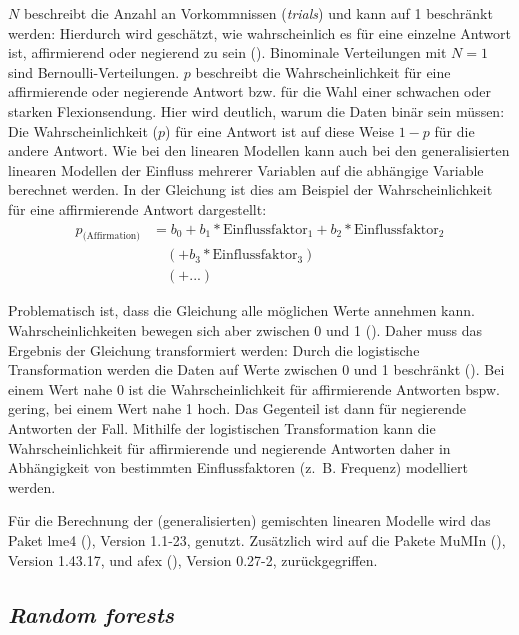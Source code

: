 $N$ beschreibt die Anzahl an Vorkommnissen (\textit{trials}) und kann auf 1 beschränkt werden: Hierdurch wird geschätzt, wie wahrscheinlich es für eine einzelne Antwort ist, affirmierend oder negierend zu sein (\cite[200]{Winter.2020}). Binominale Verteilungen mit $N=1$ sind Bernoulli-Verteilungen. $p$ beschreibt die Wahrscheinlichkeit für eine affirmierende oder negierende Antwort bzw. für die Wahl einer schwachen oder starken Flexionsendung. Hier wird deutlich, warum die Daten binär sein müssen: Die Wahrscheinlichkeit ($p$) für eine Antwort ist auf diese Weise $1-p$ für die andere Antwort. Wie bei den linearen Modellen kann auch bei den generalisierten linearen Modellen der Einfluss mehrerer Variablen auf die abhängige Variable berechnet werden. In der Gleichung ist dies am Beispiel der Wahrscheinlichkeit für eine affirmierende Antwort dargestellt: 
\[
\begin{split}
p_{\text{(Affirmation)}} & =  b{_0} + b{_1} * \text{Einflussfaktor}{_1} + b{_2} * \text{Einflussfaktor}{_2} \\
                         & \quad (+ b{_3}* \text{Einflussfaktor}{_3})\\
                         & \quad (+ ...)
\end{split}
\]

Problematisch ist, dass die Gleichung alle möglichen Werte annehmen kann. Wahrscheinlichkeiten bewegen sich aber zwischen 0 und 1 (\cite[201]{Winter.2020}). Daher muss das Ergebnis der Gleichung transformiert werden: Durch die logistische Transformation werden die Daten auf Werte zwischen 0 und 1 beschränkt (\cite[201--202]{Winter.2020}). Bei einem Wert nahe 0 ist die Wahrscheinlichkeit für affirmierende Antworten bspw. gering, bei einem Wert nahe 1 hoch. Das Gegenteil ist dann für negierende Antworten der Fall.  Mithilfe der logistischen Transformation kann die Wahrscheinlichkeit für affirmierende und negierende Antworten daher in Abhängigkeit von bestimmten Einflussfaktoren (z.~B. Frequenz) modelliert werden. 
 
Für die Berechnung der (generalisierten) gemischten linearen Modelle wird das Paket lme4 (\cite{Bates.2015}), Version 1.1-23, genutzt. Zusätzlich wird auf die Pakete MuMIn (\cite{Barton.2019}), Version 1.43.17, und afex (\cite{Singmann.2019}), Version 0.27-2, zurückgegriffen. 

\subsection{\textit{Random forests}}

